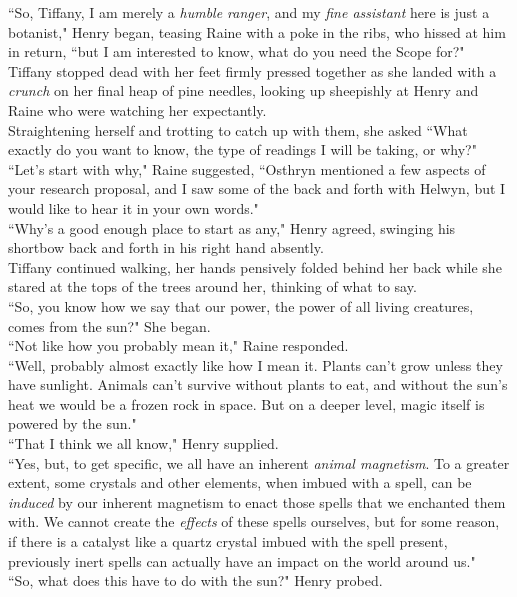 ``So, Tiffany, I am merely a \textit{humble ranger}, and my \textit{fine assistant} here is just a botanist," Henry began, teasing Raine with a poke in the ribs, who hissed at him in return, ``but I am interested to know, what do you need the Scope for?"\\
Tiffany stopped dead with her feet firmly pressed together as she landed with a \textit{crunch} on her final heap of pine needles, looking up sheepishly at Henry and Raine who were watching her expectantly.\\
Straightening herself and trotting to catch up with them, she asked ``What exactly do you want to know, the type of readings I will be taking, or why?"\\
``Let's start with why," Raine suggested, ``Osthryn mentioned a few aspects of your research proposal, and I saw some of the back and forth with Helwyn, but I would like to hear it in your own words."\\
``Why's a good enough place to start as any," Henry agreed, swinging his shortbow back and forth in his right hand absently.\\

Tiffany continued walking, her hands pensively folded behind her back while she stared at the tops of the trees around her, thinking of what to say.\\
``So, you know how we say that our power, the power of all living creatures, comes from the sun?" She began.\\
``Not like how you probably mean it," Raine responded.\\
``Well, probably almost exactly like how I mean it. Plants can't grow unless they have sunlight. Animals can't survive without plants to eat, and without the sun's heat we would be a frozen rock in space. But on a deeper level, magic itself is powered by the sun."\\
``That I think we all know," Henry supplied.\\
``Yes, but, to get specific, we all have an inherent \textit{animal magnetism}. To a greater extent, some crystals and other elements, when imbued with a spell, can be \textit{induced} by our inherent magnetism to enact those spells that we enchanted them with. We cannot create the \textit{effects} of these spells ourselves, but for some reason, if there is a catalyst like a quartz crystal imbued with the spell present, previously inert spells can actually have an impact on the world around us."\\
``So, what does this have to do with the sun?" Henry probed.\\

